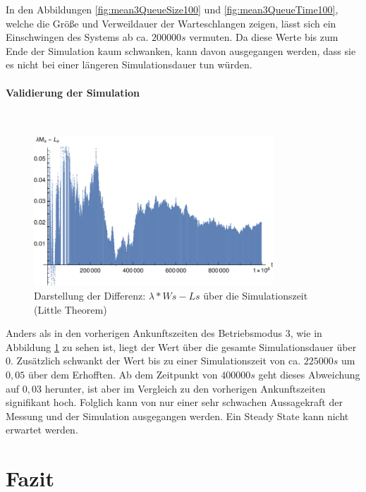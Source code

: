 In den Abbildungen \ref{fig:mean3QueueSize100} und \ref{fig:mean3QueueTime100}, welche die Größe und Verweildauer der Warteschlangen zeigen, lässt sich ein Einschwingen des Systems ab ca. $200000s$ vermuten. Da diese Werte bis zum Ende der Simulation kaum schwanken, kann davon ausgegangen werden, dass sie es nicht bei einer längeren Simulationsdauer tun würden.

\paragraph{Validierung der Simulation}
\\
\begin{figure}[htpb]
	\centering
	\includegraphics[width=0.8\textwidth]{abbildungen/2_Phone_VIP/Arrival_100_Serve_100_dur_1000000_Skip_0/LittleSystem.pdf}
	\caption{Darstellung der Differenz: $\lambda * Ws - Ls$ über die Simulationszeit (Little Theorem)}
	\label{fig:Little3System100}
\end{figure} 

Anders als in den vorherigen Ankunftszeiten des Betriebsmodus 3, wie in Abbildung \ref{fig:Little3System100} zu sehen ist, liegt der Wert über die gesamte Simulationsdauer über $0$. Zusätzlich schwankt der Wert bis zu einer Simulationszeit von ca. $225000s$ um $0,05$ über dem Erhofften. Ab dem Zeitpunkt von $400000s$ geht dieses Abweichung auf $0,03$ herunter, ist aber im Vergleich zu den vorherigen Ankunftszeiten signifikant hoch. Folglich kann von nur einer sehr schwachen Aussagekraft der Messung und der Simulation ausgegangen werden. Ein Steady State kann nicht erwartet werden.

\section{Fazit}

%
 


